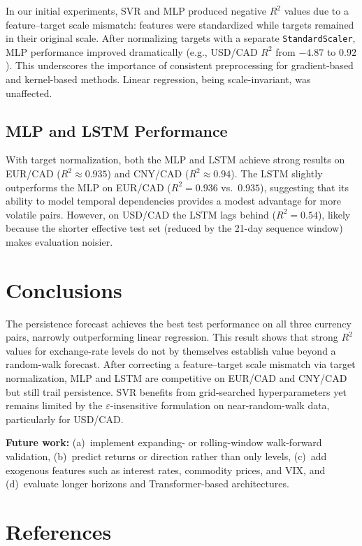\documentclass{article}
\begin{document}
In our initial experiments, SVR and MLP produced negative $R^2$ values due to a feature--target scale mismatch: features were standardized while targets remained in their original scale. After normalizing targets with a separate \texttt{StandardScaler}, MLP performance improved dramatically (e.g., USD/CAD $R^2$ from $-4.87$ to $0.92$). This underscores the importance of consistent preprocessing for gradient-based and kernel-based methods. Linear regression, being scale-invariant, was unaffected.

\subsection{MLP and LSTM Performance}

With target normalization, both the MLP and LSTM achieve strong results on EUR/CAD ($R^2 \approx 0.935$) and CNY/CAD ($R^2 \approx 0.94$). The LSTM slightly outperforms the MLP on EUR/CAD ($R^2 = 0.936$ vs.\ $0.935$), suggesting that its ability to model temporal dependencies provides a modest advantage for more volatile pairs. However, on USD/CAD the LSTM lags behind ($R^2 = 0.54$), likely because the shorter effective test set (reduced by the 21-day sequence window) makes evaluation noisier.

\section{Conclusions}

The persistence forecast achieves the best test performance on all three currency pairs, narrowly outperforming linear regression. This result shows that strong $R^2$ values for exchange-rate levels do not by themselves establish value beyond a random-walk forecast. After correcting a feature--target scale mismatch via target normalization, MLP and LSTM are competitive on EUR/CAD and CNY/CAD but still trail persistence. SVR benefits from grid-searched hyperparameters yet remains limited by the $\varepsilon$-insensitive formulation on near-random-walk data, particularly for USD/CAD.

\textbf{Future work:} (a)~implement expanding- or rolling-window walk-forward validation, (b)~predict returns or direction rather than only levels, (c)~add exogenous features such as interest rates, commodity prices, and VIX, and (d)~evaluate longer horizons and Transformer-based architectures.


\section*{References}
\end{document}
